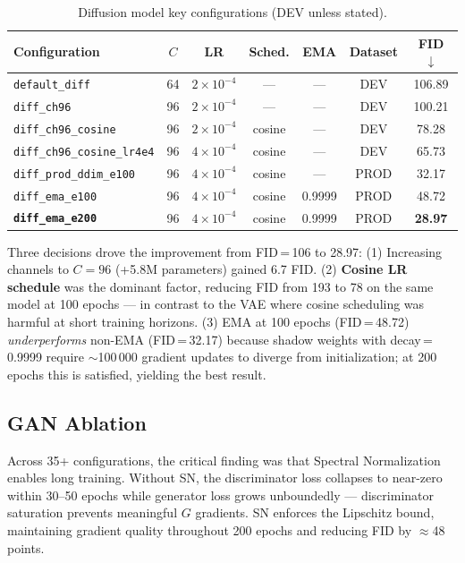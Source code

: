 \documentclass[runningheads]{llncs}
\begin{document}
\begin{table}[htbp]
\caption{Diffusion model key configurations (DEV unless stated).}\label{tab:diff_ablation}
\centering
\begin{tabular}{lcccccc}
\toprule
Configuration & $C$ & LR & Sched. & EMA & Dataset & FID $\downarrow$ \\
\midrule
\texttt{default\_diff}             & 64 & $2{\times}10^{-4}$ & —      & —      & DEV  & 106.89 \\
\texttt{diff\_ch96}                & 96 & $2{\times}10^{-4}$ & —      & —      & DEV  & 100.21 \\
\texttt{diff\_ch96\_cosine}        & 96 & $2{\times}10^{-4}$ & cosine & —      & DEV  & 78.28  \\
\texttt{diff\_ch96\_cosine\_lr4e4} & 96 & $4{\times}10^{-4}$ & cosine & —      & DEV  & 65.73  \\
\texttt{diff\_prod\_ddim\_e100}    & 96 & $4{\times}10^{-4}$ & cosine & —      & PROD & 32.17  \\
\texttt{diff\_ema\_e100}           & 96 & $4{\times}10^{-4}$ & cosine & 0.9999 & PROD & 48.72  \\
\textbf{\texttt{diff\_ema\_e200}}  & 96 & $4{\times}10^{-4}$ & cosine & 0.9999 & PROD & \textbf{28.97} \\
\bottomrule
\end{tabular}
\end{table}

Three decisions drove the improvement from FID\,=\,106 to 28.97: (1) Increasing channels to $C=96$ (+5.8M parameters) gained 6.7 FID. (2) \textbf{Cosine LR schedule} was the dominant factor, reducing FID from 193 to 78 on the same model at 100 epochs — in contrast to the VAE where cosine scheduling was harmful at short training horizons. (3) EMA at 100 epochs (FID\,=\,48.72) \emph{underperforms} non-EMA (FID\,=\,32.17) because shadow weights with decay\,=\,0.9999 require $\sim$100\,000 gradient updates to diverge from initialization; at 200 epochs this is satisfied, yielding the best result.

\subsection{GAN Ablation}

Across 35+ configurations, the critical finding was that Spectral Normalization enables long training. Without SN, the discriminator loss collapses to near-zero within 30--50 epochs while generator loss grows unboundedly — discriminator saturation prevents meaningful $G$ gradients. SN enforces the Lipschitz bound, maintaining gradient quality throughout 200 epochs and reducing FID by $\approx$48 points.
\end{document}
